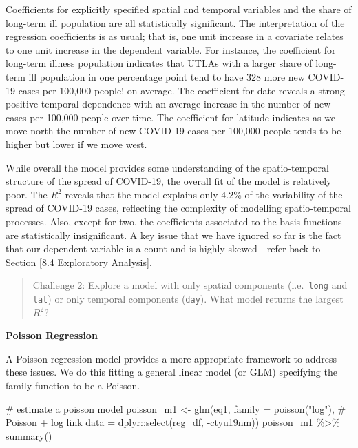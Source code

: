 \documentclass[
  letterpaper,
  DIV=11,
  numbers=noendperiod,
  oneside]{scrreprt}
\newenvironment{Shaded}{\begin{snugshade}}{\end{snugshade}}
\newcommand{\AttributeTok}[1]{\textcolor[rgb]{0.40,0.45,0.13}{#1}}
\newcommand{\CommentTok}[1]{\textcolor[rgb]{0.37,0.37,0.37}{#1}}
\newcommand{\FunctionTok}[1]{\textcolor[rgb]{0.28,0.35,0.67}{#1}}
\newcommand{\NormalTok}[1]{\textcolor[rgb]{0.00,0.23,0.31}{#1}}
\newcommand{\OtherTok}[1]{\textcolor[rgb]{0.00,0.23,0.31}{#1}}
\newcommand{\SpecialCharTok}[1]{\textcolor[rgb]{0.37,0.37,0.37}{#1}}
\newcommand{\StringTok}[1]{\textcolor[rgb]{0.13,0.47,0.30}{#1}}
\begin{document}
Coefficients for explicitly specified spatial and temporal variables and
the share of long-term ill population are all statistically significant.
The interpretation of the regression coefficients is as usual; that is,
one unit increase in a covariate relates to one unit increase in the
dependent variable. For instance, the coefficient for long-term illness
population indicates that UTLAs with a larger share of long-term ill
population in one percentage point tend to have 328 more new COVID-19
cases per 100,000 people! on average. The coefficient for date reveals a
strong positive temporal dependence with an average increase in the
number of new cases per 100,000 people over time. The coefficient for
latitude indicates as we move north the number of new COVID-19 cases per
100,000 people tends to be higher but lower if we move west.

While overall the model provides some understanding of the
spatio-temporal structure of the spread of COVID-19, the overall fit of
the model is relatively poor. The \(R^{2}\) reveals that the model
explains only 4.2\% of the variability of the spread of COVID-19 cases,
reflecting the complexity of modelling spatio-temporal processes. Also,
except for two, the coefficients associated to the basis functions are
statistically insignificant. A key issue that we have ignored so far is
the fact that our dependent variable is a count and is highly skewed -
refer back to Section {[}8.4 Exploratory Analysis{]}.

\begin{quote}
Challenge 2: Explore a model with only spatial components
(i.e.~\texttt{long} and \texttt{lat}) or only temporal components
(\texttt{day}). What model returns the largest \(R^{2}\)?
\end{quote}

\textbf{Poisson Regression}

A Poisson regression model provides a more appropriate framework to
address these issues. We do this fitting a general linear model (or GLM)
specifying the family function to be a Poisson.

\begin{Shaded}
\begin{Highlighting}[]
\CommentTok{\# estimate a poisson model}
\NormalTok{poisson\_m1 }\OtherTok{\textless{}{-}} \FunctionTok{glm}\NormalTok{(eq1,}
                \AttributeTok{family =} \FunctionTok{poisson}\NormalTok{(}\StringTok{"log"}\NormalTok{), }\CommentTok{\# Poisson + log link}
                \AttributeTok{data =}\NormalTok{ dplyr}\SpecialCharTok{::}\FunctionTok{select}\NormalTok{(reg\_df, }\SpecialCharTok{{-}}\NormalTok{ctyu19nm))}
\NormalTok{poisson\_m1 }\SpecialCharTok{\%\textgreater{}\%} \FunctionTok{summary}\NormalTok{()}
\end{Highlighting}
\end{Shaded}
\end{document}
